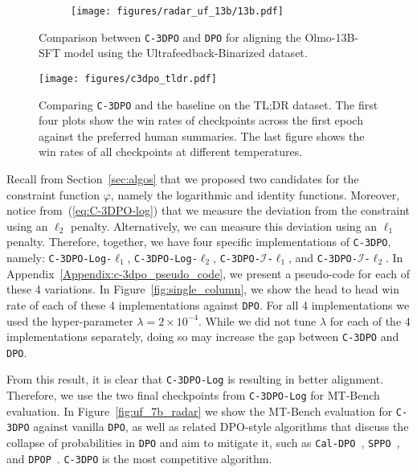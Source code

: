 \begin{figure}[h]  %
   \centering
   \begin{subfigure}{0.435\textwidth}
       \centering
       \texttt{[image: figures/radar\_uf\_13b/13b.pdf]}
   \end{subfigure}
   \caption{Comparison between \texttt{C-3DPO} and \texttt{DPO} for aligning the Olmo-13B-SFT model using the Ultrafeedback-Binarized dataset.}
   \label{fig:uf_13b_radar}
\end{figure}
\begin{figure*}[h]  %
   \centering
    \texttt{[image: figures/c3dpo\_tldr.pdf]}
   \caption{Comparing \texttt{C-3DPO} and the baseline on the TL;DR dataset. The first four plots show the win rates of checkpoints across the first epoch against the preferred human summaries. The last figure shows the win rates of all checkpoints at different temperatures.}
   \label{fig:tl;dr}
\end{figure*}

Recall from Section~\ref{sec:algos} that we proposed two candidates for the constraint function $\varphi$, namely the logarithmic and identity functions. Moreover, notice from~(\ref{eq:C-3DPO-log}) that we measure the deviation from the constraint using an $\ell_2$ penalty. Alternatively, we can measure this deviation using an $\ell_1$ penalty. Therefore, together, we have four specific implementations of \texttt{C-3DPO}, namely: \texttt{C-3DPO-Log-$\ell_1$}, \texttt{C-3DPO-Log-$\ell_2$}, \texttt{C-3DPO-$\mathcal{I}$-$\ell_1$}, and \texttt{C-3DPO-$\mathcal{I}$-$\ell_2$}. In Appendix~\ref{Appendix:c-3dpo_pseudo_code}, we present a pseudo-code for each of these 4 variations. In Figure~\ref{fig:single_column}, we show the head to head win rate of each of these 4 implementations against \texttt{DPO}. For all 4 implementations we used the hyper-parameter $\lambda=2\times 10^{-4}$. While we did not tune $\lambda$ for each of the 4 implementations separately, doing so may increase the gap between \texttt{C-3DPO} and \texttt{DPO}. 

From this result, it is clear that \texttt{C-3DPO-Log} is resulting in better alignment. Therefore, we use the two final checkpoints from \texttt{C-3DPO-Log} for MT-Bench evaluation. In Figure~\ref{fig:uf_7b_radar} we show the MT-Bench evaluation for \texttt{C-3DPO} against vanilla \texttt{DPO}, as well as related DPO-style algorithms that discuss the collapse of probabilities in \texttt{DPO} and aim to mitigate it, such as \texttt{Cal-DPO}~\cite{xiao2024caldpo}, \texttt{SPPO}~\cite{sppo}, and \texttt{DPOP}~\cite{smaug}. \texttt{C-3DPO} is the most competitive algorithm.


